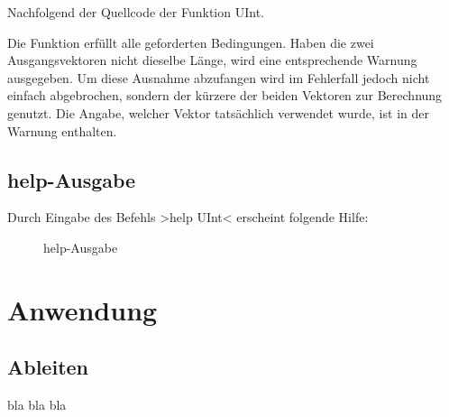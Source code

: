 \documentclass[%
  a4paper, %
  12pt, %
   article, %
  titlepage
]{scrartcl}
\begin{document}
Nachfolgend der Quellcode der Funktion UInt.
 


\newpage

Die Funktion erfüllt alle geforderten Bedingungen. Haben die zwei Ausgangsvektoren nicht dieselbe Länge, wird eine entsprechende Warnung ausgegeben.
Um diese Ausnahme abzufangen wird im Fehlerfall jedoch nicht einfach abgebrochen, sondern der kürzere der beiden Vektoren zur Berechnung genutzt.
Die Angabe, welcher Vektor tatsächlich verwendet wurde, ist in der Warnung enthalten.

 \subsection{help-Ausgabe}

Durch Eingabe des Befehls >help UInt< erscheint folgende Hilfe:

\begin{figure}[h]
\caption{help-Ausgabe}
\label{fig2}
\end{figure}

\newpage

  \section{Anwendung}
  \subsection{Ableiten}

bla bla bla
\end{document}
